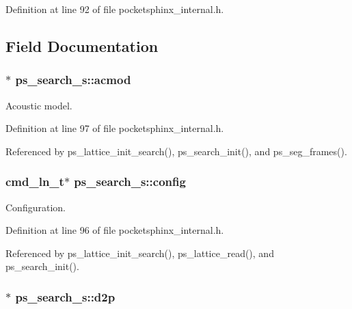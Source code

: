 Definition at line 92 of file pocketsphinx\+\_\+internal.\+h.



\subsection{Field Documentation}
\subsubsection[{acmod}]{$\ast$ ps\+\_\+search\+\_\+s\+::acmod}\label{structps__search__s_a0fdf6fe8c4d9c28f10c48c09517c6b91}


Acoustic model. 



Definition at line 97 of file pocketsphinx\+\_\+internal.\+h.



Referenced by ps\+\_\+lattice\+\_\+init\+\_\+search(), ps\+\_\+search\+\_\+init(), and ps\+\_\+seg\+\_\+frames().

\subsubsection[{config}]{\setlength{\rightskip}{0pt plus 5cm}cmd\+\_\+ln\+\_\+t$\ast$ ps\+\_\+search\+\_\+s\+::config}\label{structps__search__s_aa6e3e18165bbc70084a06575d5703042}


Configuration. 



Definition at line 96 of file pocketsphinx\+\_\+internal.\+h.



Referenced by ps\+\_\+lattice\+\_\+init\+\_\+search(), ps\+\_\+lattice\+\_\+read(), and ps\+\_\+search\+\_\+init().

\subsubsection[{d2p}]{$\ast$ ps\+\_\+search\+\_\+s\+::d2p}\label{structps__search__s_a81b461e7ef3a080d046039e186134a15}


